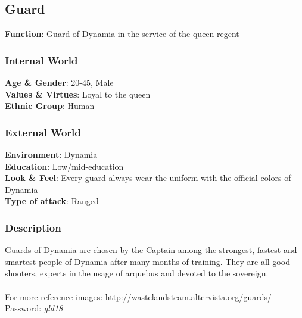 \subsection{Guard}

\begin{minipage}{0.5\textwidth}
\textbf{Function}: Guard of Dynamia in the service of the queen regent

\subsubsection{Internal World}

\textbf{Age \& Gender}: 20-45, Male \\
\textbf{Values \& Virtues}: Loyal to the queen\\
\textbf{Ethnic Group}: Human

\subsubsection{External World}
\textbf{Environment}: Dynamia \\
\textbf{Education}: Low/mid-education \\
\textbf{Look \& Feel}: Every guard always wear the uniform with the official colors of Dynamia \\
\textbf{Type of attack}: Ranged \\
\end{minipage}%
%
\hfill\begin{minipage}{0.4\textwidth}
\end{minipage}


\subsubsection{Description}
Guards of Dynamia are chosen by the Captain among the strongest, fastest and smartest people of Dynamia after many months of training. They are all good shooters, experts in the usage of arquebus and devoted to the sovereign.\\\\
For more reference images: \href{http://wastelandsteam.altervista.org/guards/}{http://wastelandsteam.altervista.org/guards/}\\
Password: \textit{gld18}



